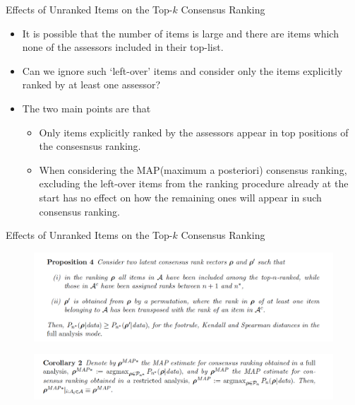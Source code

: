 \documentclass[11pt]{beamer}
\begin{document}
\begin{frame}{Effects of Unranked Items on the Top-$k$ Consensus Ranking}
\begin{itemize}
    \item It is possible that the number of items is large and there are items which none of the assessors included in their top-list. 
    \item Can we ignore such `left-over' items and consider only the items explicitly ranked by at least one assessor?
    \item The two main points are that
    \begin{itemize}
        \item Only items explicitly ranked by the assessors appear in top positions of the consesnsus ranking.
        \item When considering the MAP(maximum a posteriori) consensus ranking, excluding the left-over items from the ranking procedure already at the start has no effect on how the remaining ones will appear in such consensus ranking.
    \end{itemize}
\end{itemize}
\end{frame}

\begin{frame}{Effects of Unranked Items on the Top-$k$ Consensus Ranking}
\begin{figure}[h]
    \includegraphics[width=12cm]{Proposition4.png}
    \centering
\end{figure}
\begin{figure}[h]
    \includegraphics[width=12cm]{Corollary2.png}
    \centering
\end{figure}
\end{frame}
\end{document}
